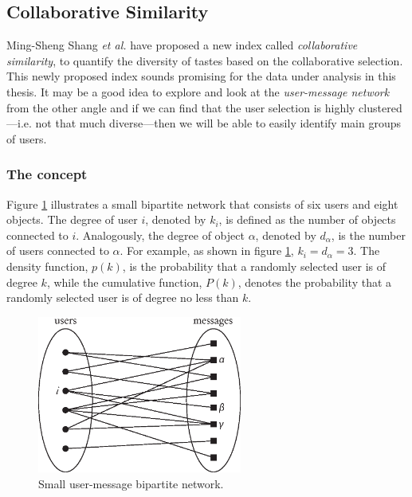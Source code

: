   \subsection{Collaborative Similarity} \label{sec:cs}
    
    Ming-Sheng Shang \textit{et al.} have proposed a new index called \emph{collaborative similarity}, to quantify the diversity of tastes based on the collaborative selection\cite{Shang2010}. This newly proposed index sounds promising for the data under analysis in this thesis. It may be a good idea to explore and look at the \emph{user-message network} from the other angle and if we can find that the user selection is highly clustered---i.e. not that much diverse---then we will be able to easily identify main groups of users.
    
    \subsubsection{The concept}
    
      Figure \ref{fig:cs_network} illustrates a small bipartite network that consists of six users and eight objects. The degree of user $i$, denoted by $k_i$, is defined as the number of objects connected to $i$. Analogously, the degree of object $\alpha$, denoted by $d_\alpha$, is the number of users connected to $\alpha$. For example, as shown in figure \ref{fig:cs_network}, $k_i = d_\alpha = 3$. The density function, $p(k)$, is the probability that a randomly selected user is of degree $k$, while the cumulative function, $P(k)$, denotes the probability that a randomly selected user is of degree no less than $k$.
      \begin{figure}[h]
        \centering
        \includegraphics[width=0.6\textwidth]{chapters/03_implementation/cs_network}
        \caption{Small user-message bipartite network.}
        \label{fig:cs_network}
      \end{figure}
      
